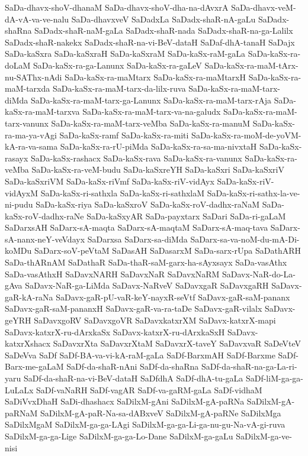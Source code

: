 {SaDa-dhavx-shoV-dhanaM
SaDa-dhavx-shoV-dha-na-dAvxrA
SaDa-dhavx-veM-dA-vA-va-ve-nalu
SaDa-dhavxveV
SaDadxLa
SaDadx-shaR-nA-gaLu
SaDadx-shaRna
SaDadx-shaR-naM-gaLa
SaDadx-shaR-nada
SaDadx-shaR-na-ga-Lalilx
SaDadx-shaR-nakekx
SaDadx-shaR-na-vi-BeV-dataH
SaDaf-dhA-tanaH
SaDajx
SaDa-kaSxra
SaDa-kaSxraH
SaDa-kaSxraM
SaDa-kaSx-raM-gaLa
SaDa-kaSx-ra-doLaM
SaDa-kaSx-ra-ga-Lanunx
SaDa-kaSx-ra-gaLeV
SaDa-kaSx-ra-maM-tArx-nu-SAThx-nAdi
SaDa-kaSx-ra-maMtarx
SaDa-kaSx-ra-maMtarxH
SaDa-kaSx-ra-maM-tarxda
SaDa-kaSx-ra-maM-tarx-da-lilx-ruva
SaDa-kaSx-ra-maM-tarx-diMda
SaDa-kaSx-ra-maM-tarx-ga-Lanunx
SaDa-kaSx-ra-maM-tarx-rAja
SaDa-kaSx-ra-maM-tarxva
SaDa-kaSx-ra-maM-tarx-va-na-galudx
SaDa-kaSx-ra-maM-tarx-vanunx
SaDa-kaSx-ra-maM-tarx-veMba
SaDa-kaSx-ra-manuM
SaDa-kaSx-ra-ma-ya-vAgi
SaDa-kaSx-ramf
SaDa-kaSx-ra-miti
SaDa-kaSx-ra-moM-de-yoVM-kA-ra-va-sama
SaDa-kaSx-ra-rU-piMda
SaDa-kaSx-ra-sa-ma-nivxtaH
SaDa-kaSx-rasayx
SaDa-kaSx-rashacx
SaDa-kaSx-rava
SaDa-kaSx-ra-vanunx
SaDa-kaSx-ra-veMba
SaDa-kaSx-ra-veM-budu
SaDa-kaSxreYH
SaDa-kaSxri
SaDa-kaSxriV
SaDa-kaSxriVM
SaDa-kaSx-riVmf
SaDa-kaSx-riV-vidAyx
SaDa-kaSx-riV-vidAyxM
SaDa-kaSx-ri-sathxla
SaDa-kaSx-ri-sathxlaM
SaDa-kaSx-ri-sathx-la-ve-ni-pudu
SaDa-kaSx-riya
SaDa-kaSxroV
SaDa-kaSx-roV-dadhx-raNaM
SaDa-kaSx-roV-dadhx-raNe
SaDa-kaSxyAR
SaDa-payxtarx
SaDari
SaDa-ri-gaLaM
SaDarxsAH
SaDarx-sA-maqta
SaDarx-sA-maqtaM
SaDarx-sA-maq-tava
SaDarx-sA-nanx-neY-veVdayx
SaDarxsa
SaDarx-sa-diMda
SaDarx-sa-va-noM-du-mA-Di-koMDu
SaDarx-soV-peVtaM
SaDasAH
SaDasarxM
SaDa-sarx-rUpa
SaDathARH
SaDa-thARnAM
SaDathaR
SaDa-thaR-saM-garx-ha-sAyxsayx
SaDa-vasAthx
SaDa-vasAthxH
SaDavxNARH
SaDavxNaR
SaDavxNaRM
SaDavx-NaR-do-La-gAva
SaDavx-NaR-ga-LiMda
SaDavx-NaRveV
SaDavxgaR
SaDavxgaRH
SaDavx-gaR-kA-raNa
SaDavx-gaR-pU-vaR-keY-nayxR-seVtf
SaDavx-gaR-saM-pananx
SaDavx-gaR-saM-pananxH
SaDavx-gaR-va-ra-taDe
SaDavx-gaR-vilalx
SaDavx-geYRH
SaDavxgoRV
SaDavxgoVR
SaDavxkatxrXM
SaDavx-katxrX-mapi
SaDavx-katxrX-ru-dArxkaSx
SaDavx-katxrX-ru-dArxkaSxH
SaDavx-katxrXshacx
SaDavxrXta
SaDavxrXtaM
SaDavxrX-taveY
SaDavxvaR
SaDeVteV
SaDeVva
SaDf
SaDf-BA-va-vi-kA-raM-gaLa
SaDf-BarxmAH
SaDf-Barxme
SaDf-Barx-me-gaLaM
SaDf-da-shaR-nAni
SaDf-da-shaRna
SaDf-da-shaR-na-ga-La-ri-yaru
SaDf-da-shaR-na-vi-BeV-dataH
SaDfdhA
SaDf-dhA-tu-gaLa
SaDf-liM-ga-ga-LuLaLx
SaDf-vaNaRH
SaDf-vagAR
SaDf-va-gaRM-gaLa
SaDf-vidhaM
SaDiVvxDhaH
SaDi-dhashacx
SaDilxM-gAni
SaDilxM-gA-paRNa
SaDilxM-gA-paRNaM
SaDilxM-gA-paR-Na-sa-dABxveV
SaDilxM-gA-paRNe
SaDilxMga
SaDilxMgaM
SaDilxM-ga-ga-LAgi
SaDilxM-ga-ga-Li-ga-nu-gu-Na-vA-gi-ruva
SaDilxM-ga-ga-Lige
SaDilxM-ga-ga-Lo-Dane
SaDilxM-ga-gaLu
SaDilxM-ga-ve-nisi
}
